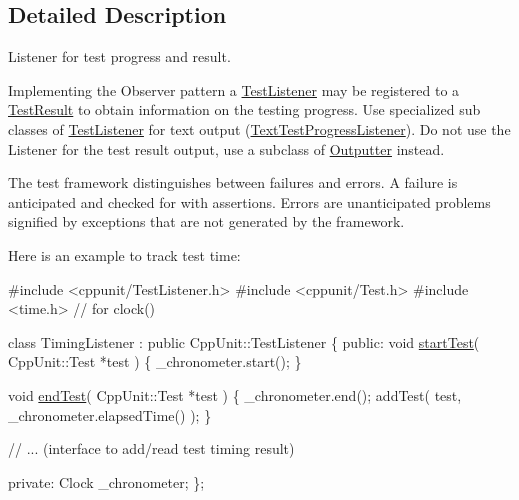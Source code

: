 \subsection{Detailed Description}
Listener for test progress and result.

Implementing the Observer pattern a \hyperlink{class_test_listener}{Test\+Listener} may be registered to a \hyperlink{class_test_result}{Test\+Result} to obtain information on the testing progress. Use specialized sub classes of \hyperlink{class_test_listener}{Test\+Listener} for text output (\hyperlink{class_text_test_progress_listener}{Text\+Test\+Progress\+Listener}). Do not use the Listener for the test result output, use a subclass of \hyperlink{class_outputter}{Outputter} instead. 

The test framework distinguishes between failures and errors. A failure is anticipated and checked for with assertions. Errors are unanticipated problems signified by exceptions that are not generated by the framework.

Here is an example to track test time\+:


\begin{DoxyCode}
\textcolor{preprocessor}{#include <cppunit/TestListener.h>}
\textcolor{preprocessor}{#include <cppunit/Test.h>}
\textcolor{preprocessor}{#include <time.h>}    \textcolor{comment}{// for clock()}

\textcolor{keyword}{class }TimingListener : \textcolor{keyword}{public} CppUnit::TestListener
\{
\textcolor{keyword}{public}:
  \textcolor{keywordtype}{void} \hyperlink{class_test_listener_a5546d4420e7412234915113b1ea5ad77}{startTest}( CppUnit::Test *test )
  \{
    \_chronometer.start();
  \}
 
  \textcolor{keywordtype}{void} \hyperlink{class_test_listener_ae8ccd0f55dd9aa7eafded05ba14f9ac6}{endTest}( CppUnit::Test *test )
  \{
    \_chronometer.end();
    addTest( test, \_chronometer.elapsedTime() );
  \}

  \textcolor{comment}{// ... (interface to add/read test timing result)}

\textcolor{keyword}{private}:
  Clock \_chronometer;
\};
\end{DoxyCode}


